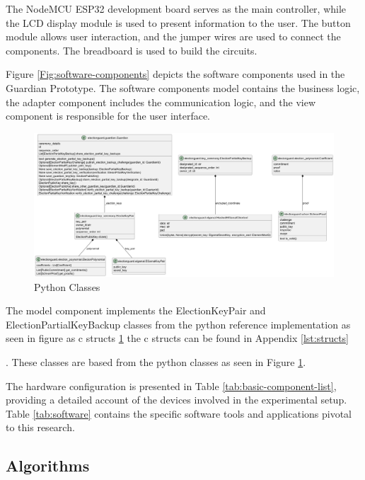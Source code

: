 The NodeMCU ESP32 development board serves as the main controller, while the LCD display module is used to present information to the user. The button module allows user interaction, and the jumper wires are used to connect the components. The breadboard is used to build the circuits. 

Figure \ref{Fig:software-components} depicts the software components used in the Guardian Prototype. The software components model contains the business logic, the adapter component includes the communication logic, and the view component is responsible for the user interface.

\begin{figure}
	\centering
	\includegraphics[scale=.7]{abbildungen/Diagramme/python-classes.png}
	\caption{Python Classes}\label{Fig:python-class} 
\end{figure}

The model component implements the ElectionKeyPair and ElectionPartialKeyBackup classes from the python reference implementation as seen in figure as c structs \ref{Fig:python-class} the c structs can be found in Appendix \ref{lst:structs} 

. These classes are based from the python classes as seen in Figure \ref{Fig:python-class}. 




The hardware configuration is presented in Table \ref{tab:basic-component-list}, providing a detailed account of the devices involved in the experimental setup. Table \ref{tab:software} contains the specific software tools and applications pivotal to this research.



\subsection{Algorithms}


